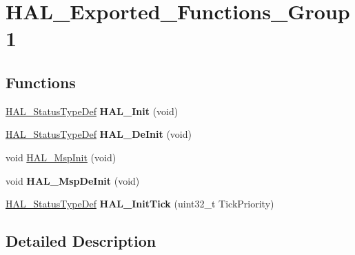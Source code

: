 \hypertarget{group___h_a_l___exported___functions___group1}{\section{H\-A\-L\-\_\-\-Exported\-\_\-\-Functions\-\_\-\-Group1}
\label{group___h_a_l___exported___functions___group1}
}
\subsection*{Functions}
\begin{DoxyCompactItemize}
\item 
\hypertarget{group___h_a_l___exported___functions___group1_gaecac54d350c3730e6831eb404e557dc4}{\hyperlink{stm32l1xx__hal__def_8h_a63c0679d1cb8b8c684fbb0632743478f}{H\-A\-L\-\_\-\-Status\-Type\-Def} {\bfseries H\-A\-L\-\_\-\-Init} (void)}\label{group___h_a_l___exported___functions___group1_gaecac54d350c3730e6831eb404e557dc4}

\item 
\hypertarget{group___h_a_l___exported___functions___group1_ga95911129a26afb05232caaaefa31956f}{\hyperlink{stm32l1xx__hal__def_8h_a63c0679d1cb8b8c684fbb0632743478f}{H\-A\-L\-\_\-\-Status\-Type\-Def} {\bfseries H\-A\-L\-\_\-\-De\-Init} (void)}\label{group___h_a_l___exported___functions___group1_ga95911129a26afb05232caaaefa31956f}

\item 
void \hyperlink{group___h_a_l___exported___functions___group1_gae4fb8e66865c87d0ebab74a726a6891f}{H\-A\-L\-\_\-\-Msp\-Init} (void)
\item 
\hypertarget{group___h_a_l___exported___functions___group1_gadd10d026ef02d00e32e80c9eab9db830}{void {\bfseries H\-A\-L\-\_\-\-Msp\-De\-Init} (void)}\label{group___h_a_l___exported___functions___group1_gadd10d026ef02d00e32e80c9eab9db830}

\item 
\hypertarget{group___h_a_l___exported___functions___group1_ga879cdb21ef051eb81ec51c18147397d5}{\hyperlink{stm32l1xx__hal__def_8h_a63c0679d1cb8b8c684fbb0632743478f}{H\-A\-L\-\_\-\-Status\-Type\-Def} {\bfseries H\-A\-L\-\_\-\-Init\-Tick} (uint32\-\_\-t Tick\-Priority)}\label{group___h_a_l___exported___functions___group1_ga879cdb21ef051eb81ec51c18147397d5}

\end{DoxyCompactItemize}


\subsection{Detailed Description}


